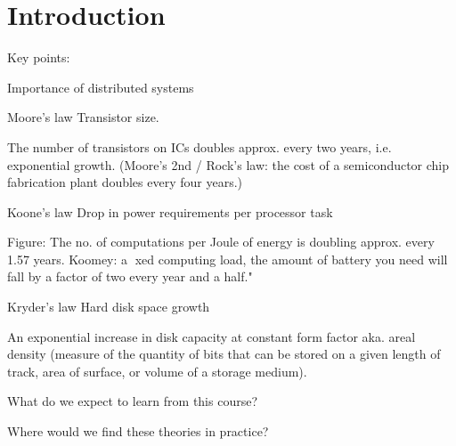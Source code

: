 \chapter{Introduction} \label{ch:introduction}


Key points:

    Importance of distributed systems 

    Moore's law
        Transistor size.

        The number of transistors on ICs doubles approx. every two years, i.e. exponential growth. (Moore's 2nd / Rock's law: the cost of a semiconductor chip fabrication plant doubles every four years.)

    Koone's law
        Drop in power requirements per processor task
        
        Figure: The no. of computations per Joule of energy is doubling approx. every 1.57 years. Koomey: \at a xed computing load, the amount of battery you need will fall by a factor of two every year and a half."

    Kryder's law
        Hard disk space growth

        An exponential increase in disk capacity at constant form factor aka. areal density (measure of the quantity of bits that can be stored on a given length of track, area of surface, or volume of a storage medium).
    
    What do we expect to learn from this course?

    Where would we find these theories in practice?
